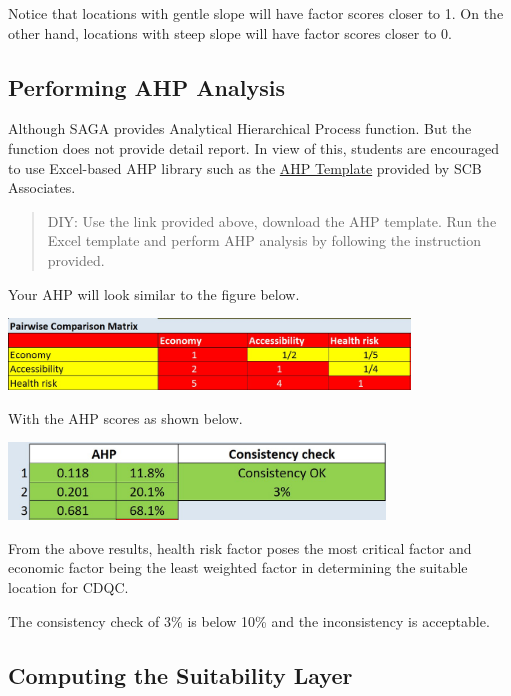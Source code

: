 \documentclass[
  letterpaper,
  DIV=11,
  numbers=noendperiod]{scrreprt}
\begin{document}
Notice that locations with gentle slope will have factor scores closer
to 1. On the other hand, locations with steep slope will have factor
scores closer to 0.

\hypertarget{performing-ahp-analysis}{%
\subsection{Performing AHP Analysis}\label{performing-ahp-analysis}}

Although SAGA provides Analytical Hierarchical Process function. But the
function does not provide detail report. In view of this, students are
encouraged to use Excel-based AHP library such as the
\href{https://www.scbuk.com/ahp.html}{AHP Template} provided by SCB
Associates.

\begin{quote}
DIY: Use the link provided above, download the AHP template. Run the
Excel template and perform AHP analysis by following the instruction
provided.
\end{quote}

Your AHP will look similar to the figure below.

\includegraphics[width=0.8\textwidth,height=\textheight]{./img08/image17.jpg}

With the AHP scores as shown below.

\includegraphics[width=0.75\textwidth,height=\textheight]{./img08/image18.jpg}

From the above results, health risk factor poses the most critical
factor and economic factor being the least weighted factor in
determining the suitable location for CDQC.

The consistency check of 3\% is below 10\% and the inconsistency is
acceptable.

\hypertarget{computing-the-suitability-layer}{%
\subsection{Computing the Suitability
Layer}\label{computing-the-suitability-layer}}
\end{document}
